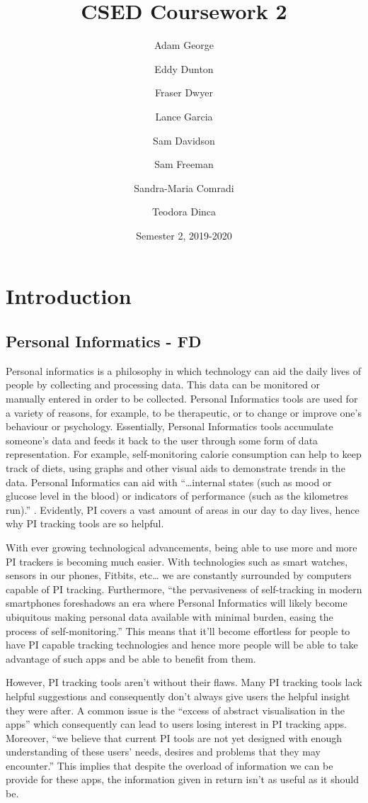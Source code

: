 \documentclass[12pt]{report}
\title{CSED Coursework 2}
\author{
	Adam George
	\and
	Eddy Dunton
	\and
	Fraser Dwyer
	\and	
	Lance Garcia
	\and
	Sam Davidson
	\and
	Sam Freeman
	\and
	Sandra-Maria Comradi
	\and
	Teodora Dinca
}
\date{Semester 2,  2019-2020}
\begin{document}
\begin{titlepage}
\maketitle
\end{titlepage}

\tableofcontents

\chapter{Introduction}

\section{Personal Informatics - FD}

Personal informatics is a philosophy in which technology can aid the daily lives of people by collecting and processing data. This data can be monitored or manually entered in order to be collected. Personal Informatics tools are used for a variety of reasons, for example, to be therapeutic, or to change or improve one’s behaviour or psychology. Essentially, Personal Informatics tools accumulate someone’s data and feeds it back to the user through some form of data representation. For example, self-monitoring calorie consumption can help to keep track of diets, using graphs and other visual aids to demonstrate trends in the data. Personal Informatics can aid with “…internal states (such as mood or glucose level in the blood) or indicators of performance (such as the kilometres run).”  \cite{Rapp2014a} . Evidently, PI covers a vast amount of areas in our day to day lives, hence why PI tracking tools are so helpful.

With ever growing technological advancements, being able to use more and more PI trackers is becoming much easier. With technologies such as smart watches, sensors in our phones, Fitbits, etc… we are constantly surrounded by computers capable of PI tracking. Furthermore, “the pervasiveness of self-tracking in modern smartphones foreshadows an era where Personal Informatics will likely become ubiquitous making personal data available with minimal burden, easing the process of self-monitoring.” This means that it’ll become effortless for people to have PI capable tracking technologies and hence more people will be able to take advantage of such apps and be able to benefit from them.\cite{Rapp2016}

However, PI tracking tools aren’t without their flaws. Many PI tracking tools lack helpful suggestions and consequently don’t always give users the helpful insight they were after. A common issue is the “excess of abstract visualisation in the apps” \cite{Rapp2016} which consequently can lead to users losing interest in PI tracking apps. Moreover, “we believe that current PI tools are not yet designed with enough understanding of these users’ needs, desires and problems that they may encounter.” \cite{Rapp2016} This implies that despite the overload of information we can be provide for these apps, the information given in return isn’t as useful as it should be.
\end{document}
